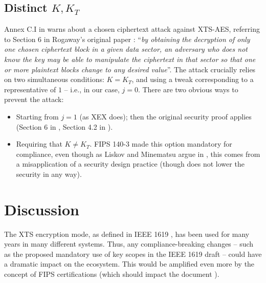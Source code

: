\documentclass[a4paper]{article}
\begin{document}
\subsection{Distinct \texorpdfstring{$K, K_T$}{K, KT}}
Annex C.I in \cite{fips-140-3} warns about a chosen ciphertext attack against XTS-AES, referring to Section 6 in Rogaway's original paper \cite{rogaway2004efficient}: ``\emph{by
obtaining the decryption of only one chosen ciphertext block in a given data sector, an adversary who does not
know the key may be able to manipulate the ciphertext in that sector so that one or more plaintext blocks
change to any desired value}''. The attack crucially relies on two simultaneous conditions: $K=K_T$, and using a tweak corresponding to a representative of $1$ -- i.e., in our case, $j=0$.
There are two obvious ways to prevent the attack:
\begin{itemize}
    \item Starting from $j=1$ (as XEX does); then the original security proof applies (Section 6 in \cite{rogaway2004efficient}, Section 4.2 in \cite{minematsu2006improved}).
    \item Requiring that $K \ne K_T$. FIPS 140-3 \cite{fips-140-3} made this option mandatory for compliance, even though as Liskov and Minematsu argue in \cite{liskov2008comments}, this comes from a misapplication of a security design practice (though does not lower the security in any way). 
\end{itemize}

\section{Discussion}
The XTS encryption mode, as defined in IEEE 1619 \cite{IEEE1619-2018}, has been used for many years in many different systems. Thus, any compliance-breaking changes -- such as the proposed mandatory use of key scopes in the IEEE 1619 draft \cite{IEEE1619-draft} -- could have a dramatic impact on the ecosystem. This would be amplified even more by the concept of FIPS certifications (which should impact the document \cite{fips-140-3}).
\end{document}
